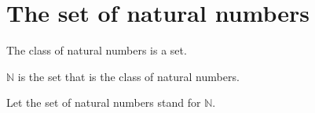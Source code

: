 \documentclass[../../basic-notions.ftl.tex]{subfiles}
\begin{document}


  \section{The set of natural numbers}

  \begin{forthel}
    \begin{axiom}
      The class of natural numbers is a set.
    \end{axiom}

    \begin{definition}
      $\mathbb{N}$ is the set that is the class of natural numbers.
    \end{definition}

    Let the set of natural numbers stand for $\mathbb{N}$.
  \end{forthel}
\end{document}
